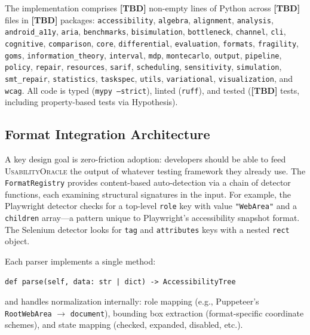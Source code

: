 \documentclass[11pt,twocolumn]{article}
\theoremstyle{definition}
\newcommand{\tool}{\textsc{UsabilityOracle}}
\begin{document}
The implementation comprises \textbf{[TBD]} non-empty lines of Python across \textbf{[TBD]} files in \textbf{[TBD]} packages:
\texttt{accessibility}, \texttt{algebra}, \texttt{alignment}, \texttt{analysis}, \texttt{android\_a11y}, \texttt{aria}, \texttt{benchmarks}, \texttt{bisimulation}, \texttt{bottleneck}, \texttt{channel}, \texttt{cli}, \texttt{cognitive}, \texttt{comparison}, \texttt{core}, \texttt{differential}, \texttt{evaluation}, \texttt{formats}, \texttt{fragility}, \texttt{goms}, \texttt{information\_theory}, \texttt{interval}, \texttt{mdp}, \texttt{montecarlo}, \texttt{output}, \texttt{pipeline}, \texttt{policy}, \texttt{repair}, \texttt{resources}, \texttt{sarif}, \texttt{scheduling}, \texttt{sensitivity}, \texttt{simulation}, \texttt{smt\_repair}, \texttt{statistics}, \texttt{taskspec}, \texttt{utils}, \texttt{variational}, \texttt{visualization}, and \texttt{wcag}.
All code is typed (\texttt{mypy --strict}), linted (\texttt{ruff}), and tested (\textbf{[TBD]} tests, including property-based tests via Hypothesis).

\subsection{Format Integration Architecture}
\label{sec:formats}

A key design goal is zero-friction adoption: developers should be able to feed \tool{} the output of whatever testing framework they already use.
The \texttt{FormatRegistry} provides content-based auto-detection via a chain of detector functions, each examining structural signatures in the input.
For example, the Playwright detector checks for a top-level \texttt{role} key with value \texttt{"WebArea"} and a \texttt{children} array---a pattern unique to Playwright's accessibility snapshot format.
The Selenium detector looks for \texttt{tag} and \texttt{attributes} keys with a nested \texttt{rect} object.

Each parser implements a single method:
\begin{lstlisting}
def parse(self, data: str | dict) -> AccessibilityTree
\end{lstlisting}
\noindent and handles normalization internally: role mapping (e.g., Puppeteer's \texttt{RootWebArea} $\to$ \texttt{document}), bounding box extraction (format-specific coordinate schemes), and state mapping (checked, expanded, disabled, etc.).
\end{document}
